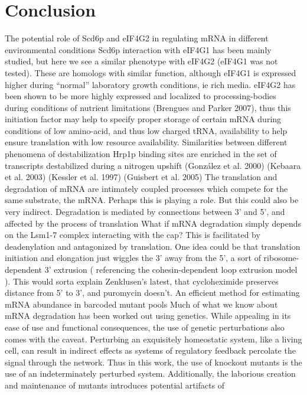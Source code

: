 \chapter{Conclusion}

The potential role of Scd6p and eIF4G2 in
regulating mRNA in different environmental conditions Scd6p
interaction with eIF4G1 has been mainly studied, but here we see a
similar phenotype with eIF4G2 (eIF4G1 was not tested). These are
homologs with similar function, although eIF4G1 is expressed higher
during “normal” laboratory growth conditions, ie rich media. eIF4G2
has been shown to be more highly expressed and localized to
processing-bodies during conditions of nutrient limitations (Brengues
and Parker 2007), thus this initiation factor may help to specify
proper storage of certain mRNA during conditions of low amino-acid,
and thus low charged tRNA, availability to help ensure translation
with low resource availability.  Similarities between different
phenomena of destabilization Hrp1p binding sites are enriched in the
set of transcripts destabilized during a nitrogen upshift (González et
al. 2000) (Kebaara et al. 2003) (Kessler et al. 1997) (Guisbert et al.
2005) The translation and degradation of mRNA are intimately coupled
processes which compete for the same substrate, the mRNA. Perhaps this
is playing a role. But this could also be very indirect.  Degradation
is mediated by connections between 3’ and 5’, and affected by the
process of translation What if mRNA degradation simply depends on the
Lsm1-7 complex interacting with the cap? This is facilitated by
deadenylation and antagonized by translation. One idea could be that
translation initiation and elongation just wiggles the 3’ away from
the 5’, a sort of ribosome-dependent 3’ extrusion ( referencing the
cohesin-dependent loop extrusion model ).  This would sorta explain
Zenklusen’s latest, that cycloheximide preserves distance from 5’ to
3’, and puromycin doesn’t.  An efficient method for estimating mRNA
abundance in barcoded mutant pools Much of what we know about mRNA
degradation has been worked out using genetics. While appealing in its
ease of use and functional consequences, the use of genetic
perturbations also comes with the caveat. Perturbing an exquisitely
homeostatic system, like a living cell, can result in indirect effects
as systems of regulatory feedback percolate the signal through the
network. Thus in this work, the use of knockout mutants is the use of
an indeterminately perturbed system. Additionally, the laborious
creation and maintenance of mutants introduces potential artifacts of
